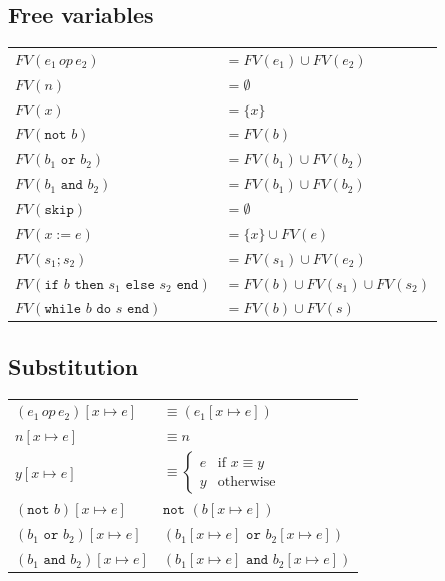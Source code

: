 \documentclass{article}
\def\nott{\texttt{not }}
\def\andt{\texttt{ and }}
\def\ort{\texttt{ or }}
\def\ift{\texttt{if }}
\def\thent{\texttt{ then }}
\def\elset{\texttt{ else }}
\def\endt{\texttt{ end}}
\def\skipt{\texttt{skip}}
\def\whilet{\texttt{while }}
\def\dot{\texttt{ do }}
\begin{document}
\subsection{Free variables}
\begin{center}
    \begin{tabular}{l l}
        $FV(e_1 \, op \, e_2)$ & $=FV(e_1) \cup FV(e_2)$ \\
        $FV(n)$ & $=\emptyset$ \\
        $FV(x)$ & $=\{x\}$ \\
        $FV(\nott b)$ & $=FV(b)$ \\
        $FV(b_1 \ort b_2)$ & $=FV(b_1) \cup FV(b_2)$ \\
        $FV(b_1 \andt b_2)$ & $=FV(b_1) \cup FV(b_2)$ \\
        $FV(\skipt)$ & $= \emptyset$ \\
        $FV(x:=e)$ & $= \{x\} \cup FV(e)$ \\
        $FV(s_1;s_2)$ & $= FV(s_1) \cup FV(e_2)$ \\
        $FV(\ift b \thent s_1 \elset s_2 \endt )$ & $= FV(b) \cup FV(s_1) \cup FV(s_2)$ \\
        $FV(\whilet b \dot s \endt)$ & $= FV(b) \cup FV(s)$ \\
    \end{tabular}
\end{center}

\subsection{Substitution}

\begin{center}
    \begin{tabular}{l l}
        $(e_1 \, op \, e_2)[x \mapsto e]$ & $\equiv (e_1[x\mapsto e])$ \\
        $n[x\mapsto e]$ & $\equiv n$\\
        $y[x\mapsto e]$ & $\equiv\begin{cases} e & \text{if } x \equiv y \\ y & \text{otherwise} \end{cases}$\\
        $(\nott b)[x\mapsto e]$ & $\nott (b[x\mapsto e])$ \\
        $(b_1 \ort b_2)[x\mapsto e]$ &  $(b_1[x\mapsto e] \ort b_2[x\mapsto e])$ \\
        $(b_1 \andt b_2)[x\mapsto e]$ &  $(b_1[x\mapsto e] \andt b_2[x\mapsto e])$ \\
    \end{tabular}
\end{center}
\end{document}
